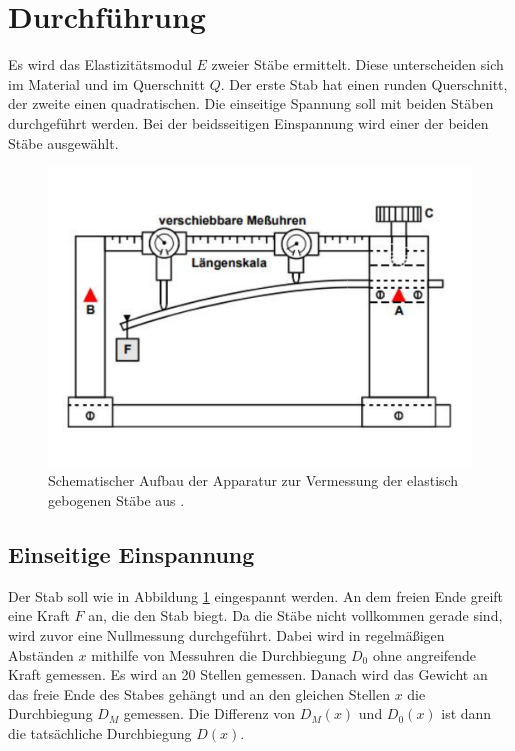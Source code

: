 \section{Durchführung}
\label{sec:Durchführung}
Es wird das Elastizitätsmodul $E$ zweier Stäbe ermittelt.
Diese unterscheiden sich im Material und im Querschnitt $Q$.
Der erste Stab hat einen runden Querschnitt, der zweite einen quadratischen.
Die einseitige Spannung soll mit beiden Stäben durchgeführt werden.
Bei der beidsseitigen Einspannung wird einer der beiden Stäbe ausgewählt.
\begin{figure}
    \centering
    \includegraphics[width=\textwidth]{Messapparat.pdf} 
    \caption{Schematischer Aufbau der Apparatur zur Vermessung der elastisch gebogenen Stäbe aus \cite{anleitung}.}
    \label{fig:Messapparat}
\end{figure}
\subsection{Einseitige Einspannung}
\label{subsec:einseitigeEinspannung}
Der Stab soll wie in Abbildung \ref{fig:Messapparat} eingespannt werden.
An dem freien Ende greift eine Kraft $F$ an, die den Stab biegt.
Da die Stäbe nicht vollkommen gerade sind, wird zuvor eine Nullmessung durchgeführt.
Dabei wird in regelmäßigen Abständen $x$ mithilfe von Messuhren die Durchbiegung $D_0$ ohne angreifende Kraft gemessen.
Es wird an 20 Stellen gemessen.
Danach wird das Gewicht an das freie Ende des Stabes gehängt und an den gleichen Stellen $x$ die Durchbiegung $D_M$ gemessen.
Die Differenz von $D_M(x)$ und $D_0(x)$ ist dann die tatsächliche Durchbiegung $D(x)$.

